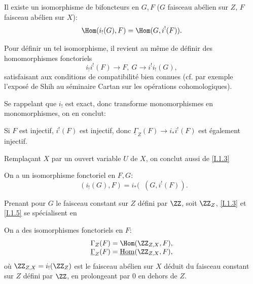 \begin{proposition} \label{I.1.3} Il existe un isomorphisme de bifoncteurs en $G, F$ ($G$ faisceau ab\'elien sur $Z$, $F$ faisceau ab\'elien sur $X$):
\begin{equation} \label{eq:I.10} {\Hom(i_!(G), F) = \Hom (G, i^!(F))}.
\end{equation}
\end{proposition}

Pour d\'efinir un tel isomorphisme, il revient au m\^eme de d\'efinir des homomorphismes fonctoriels
$$i_!i^!(F) \to F, \ G \to i^!i_!(G),
$$
satisfaisant aux conditions de compatibilit\'e bien connues (cf. par exemple l'expos\'e de Shih au s\'eminaire Cartan sur les op\'erations cohomologiques).

Se rappelant que $i_!$ est exact, donc transforme monomorphismes en monomorphismes, on en conclut:

\begin{corollaire} \label{I.1.4}
Si $F$ est injectif, $i^!(F)$ est injectif, donc $\underline{\Gamma}_Z(F) \to i_*i^!(F)$ est \'egalement injectif.
\end{corollaire}

Rempla\c cant $X$ par un ouvert variable $U$ de $X$, on conclut
aussi de \ref{I.1.3}

\begin{corollaire} \label{I.1.5} On a un isomorphisme fonctoriel en $F, G$:
\begin{equation} \label{eq:I.11}
\mathop{\underline{\mathrm{Hom}}}\nolimits{(i_!(G), F)} =i_*(\mathop{\underline{\mathrm{Hom}}}\nolimits{(G, i^!(F))}.
\end{equation}
\end{corollaire}

Prenant pour $G$ le faisceau constant sur $Z$ d\'efini par $\ZZ$, soit $\ZZ_Z$, \ref{I.1.3} et \ref{I.1.5} se sp\'ecialisent en

\begin{corollaire} \label{I.1.6} On a des isomorphismes fonctoriels en $F$:
\begin{equation} \label{eq:I.12}
\begin{array}[c]{l} {\Gamma_Z(F)=\Hom(\ZZ_{Z, X}, F)}, \\
{\underline{\Gamma}_Z(F)=\mathop{\underline{\mathrm{Hom}}}\nolimits(\ZZ_{Z, X}, F)},
\end{array}
\end{equation}
o\`u $\ZZ_{Z, X}= i_!(\ZZ_Z)$ est le faisceau ab\'elien sur $X$ d\'eduit du faisceau constant sur $Z$ d\'efini par $\ZZ$, en prolongeant par $0$ en dehors de $Z$.
\end{corollaire}

